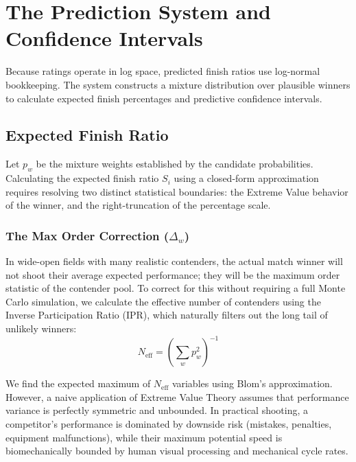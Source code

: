 \documentclass[12pt]{article}
\begin{document}
	\section{The Prediction System and Confidence Intervals}
	\label{sec:prediction}

	Because ratings operate in log space, predicted finish ratios use log-normal bookkeeping. The system constructs a mixture distribution over plausible winners to calculate expected finish percentages and predictive confidence intervals.

	\subsection{Expected Finish Ratio}
	Let $p_w$ be the mixture weights established by the candidate probabilities. Calculating the expected finish ratio $S_i$ using a closed-form approximation requires resolving two distinct statistical boundaries: the Extreme Value behavior of the winner, and the right-truncation of the percentage scale.

	\subsubsection*{The Max Order Correction ($\Delta_w$)}
	In wide-open fields with many realistic contenders, the actual match winner will not shoot their average expected performance; they will be the maximum order statistic of the contender pool. To correct for this without requiring a full Monte Carlo simulation, we calculate the effective number of contenders using the Inverse Participation Ratio (IPR), which naturally filters out the long tail of unlikely winners:
	\begin{equation}
		N_{\mathrm{eff}} = \left(\sum_w p_w^2\right)^{-1}
	\end{equation}

	We find the expected maximum of $N_{\mathrm{eff}}$ variables using Blom's approximation. However, a naive application of Extreme Value Theory assumes that performance variance is perfectly symmetric and unbounded. In practical shooting, a competitor's performance is dominated by downside risk (mistakes, penalties, equipment malfunctions), while their maximum potential speed is biomechanically bounded by human visual processing and mechanical cycle rates.
\end{document}
